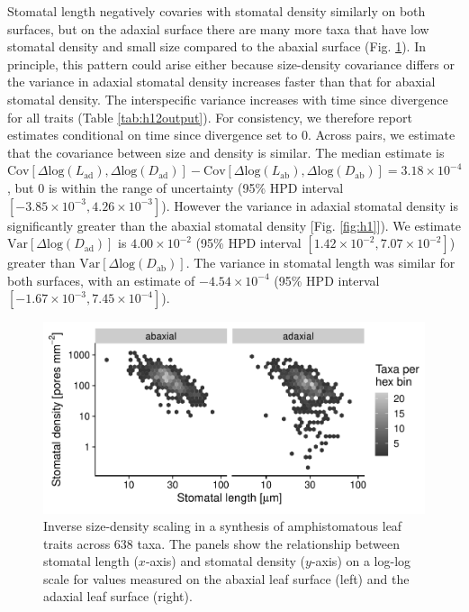 \documentclass[
  12pt,
]{article}
\begin{document}
Stomatal length negatively covaries with stomatal density similarly on both surfaces, but on the adaxial surface there are many more taxa that have low stomatal density and small size compared to the abaxial surface (Fig. \ref{fig:h1_raw}). In principle, this pattern could arise either because size-density covariance differs or the variance in adaxial stomatal density increases faster than that for abaxial stomatal density. The interspecific variance increases with time since divergence for all traits (Table \ref{tab:h12output}). For consistency, we therefore report estimates conditional on time since divergence set to 0. Across pairs, we estimate that the covariance between size and density is similar. The median estimate is \(\text{Cov}[\Delta \text{log}(L_\text{ad}), \Delta \text{log}(D_\text{ad})] - \text{Cov}[\Delta \text{log}(L_\text{ab}), \Delta \text{log}(D_\text{ab})] = 3.18 \times 10^{-4}\), but 0 is within the range of uncertainty (95\% HPD interval \([-3.85 \times 10^{-3},4.26 \times 10^{-3}]\)). However the variance in adaxial stomatal density is significantly greater than the abaxial stomatal density {[}Fig. \ref{fig:h1}{]}). We estimate \(\text{Var}[\Delta \text{log}(D_\text{ad})]\) is \(4.00 \times 10^{-2}\) (95\% HPD interval \([1.42 \times 10^{-2},7.07 \times 10^{-2}]\)) greater than \(\text{Var}[\Delta \text{log}(D_\text{ab})]\). The variance in stomatal length was similar for both surfaces, with an estimate of \(-4.54 \times 10^{-4}\) (95\% HPD interval \([-1.67 \times 10^{-3},7.45 \times 10^{-4}]\)).

\begin{figure}[ht]
\includegraphics[width=\textwidth]{../figures/h1-raw.pdf}
\caption{Inverse size-density scaling in a synthesis of amphistomatous leaf traits across 638 taxa. The panels show the relationship between stomatal length ($x$-axis) and stomatal density ($y$-axis) on a log-log scale for values measured on the abaxial leaf surface (left) and the adaxial leaf surface (right).}
\label{fig:h1_raw}
\end{figure}
\end{document}
